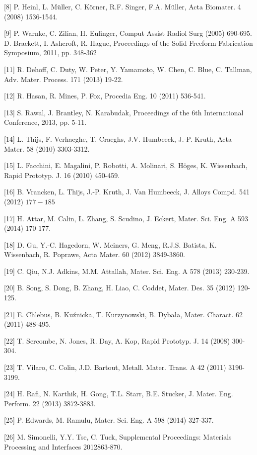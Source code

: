 \documentclass[10pt]{article}
\begin{document}
[8] P. Heinl, L. Müller, C. Körner, R.F. Singer, F.A. Müller, Acta Biomater. 4 (2008) 1536-1544.

[9] P. Warnke, C. Zilian, H. Eufinger, Comput Assist Radiol Surg (2005) 690-695.\\
[10] D. Brackett, I. Ashcroft, R. Hague, Proceedings of the Solid Freeform Fabrication Symposium, 2011, pp. 348-362

[11] R. Dehoff, C. Duty, W. Peter, Y. Yamamoto, W. Chen, C. Blue, C. Tallman, Adv. Mater. Process. 171 (2013) 19-22.

[12] R. Hasan, R. Mines, P. Fox, Procedia Eng. 10 (2011) 536-541.

[13] S. Rawal, J. Brantley, N. Karabudak, Proceedings of the 6th International Conference, 2013, pp. 5-11.

[14] L. Thijs, F. Verhaeghe, T. Craeghs, J.V. Humbeeck, J.-P. Kruth, Acta Mater. 58 (2010) 3303-3312.

[15] L. Facchini, E. Magalini, P. Robotti, A. Molinari, S. Höges, K. Wissenbach, Rapid Prototyp. J. 16 (2010) 450-459.

[16] B. Vrancken, L. Thijs, J.-P. Kruth, J. Van Humbeeck, J. Alloys Compd. 541 (2012) $177-185$

[17] H. Attar, M. Calin, L. Zhang, S. Scudino, J. Eckert, Mater. Sci. Eng. A 593 (2014) 170-177.

[18] D. Gu, Y.-C. Hagedorn, W. Meiners, G. Meng, R.J.S. Batista, K. Wissenbach, R. Poprawe, Acta Mater. 60 (2012) 3849-3860.

[19] C. Qiu, N.J. Adkins, M.M. Attallah, Mater. Sci. Eng. A 578 (2013) 230-239.

[20] B. Song, S. Dong, B. Zhang, H. Liao, C. Coddet, Mater. Des. 35 (2012) 120-125.

[21] E. Chlebus, B. Kuźnicka, T. Kurzynowski, B. Dybała, Mater. Charact. 62 (2011) 488-495.

[22] T. Sercombe, N. Jones, R. Day, A. Kop, Rapid Prototyp. J. 14 (2008) 300-304.

[23] T. Vilaro, C. Colin, J.D. Bartout, Metall. Mater. Trans. A 42 (2011) 3190-3199.

[24] H. Rafi, N. Karthik, H. Gong, T.L. Starr, B.E. Stucker, J. Mater. Eng. Perform. 22 (2013) 3872-3883.

[25] P. Edwards, M. Ramulu, Mater. Sci. Eng. A 598 (2014) 327-337.

[26] M. Simonelli, Y.Y. Tse, C. Tuck, Supplemental Proceedings: Materials Processing and Interfaces 2012863-870.
\end{document}
